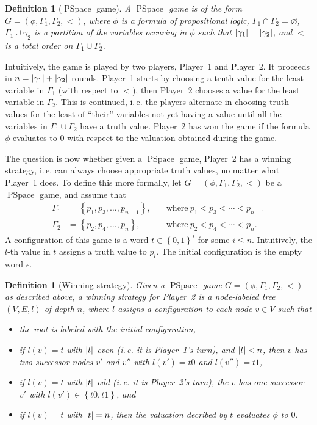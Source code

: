 \documentclass[openany]{scrbook}
\theoremstyle{break}
\newtheorem{Definition}[Theorem]{Definition}
\theoremstyle{nonumberbreak}
\theoremstyle{nonumberplain}
\theoremstyle{nonumberbreak}
\newcommand{\then}{\Longrightarrow}
\newcommand{\abs}[2][]{\left|{#2}\right|\ifx#1\then\else_{#1}\fi}
\newcommand{\set}[1]{\left\{#1\right\}}
\newcommand{\ie}{i{.}\,e{.}\xspace}
\newcommand{\PSpace}{\operatorname{PSpace}}
\begin{document}
\begin{Definition}[$\PSpace$ game]
  \label{6.3}
  A $\PSpace$ game is of the form $G = (\phi, \Gamma_1, \Gamma_2, <)$,
  where $\phi$ is a formula of propositional logic, $\Gamma_1 \cap
  \Gamma_2 = \varnothing$, $\Gamma_1 \cup \gamma_2$ is a partition of
  the variables occuring in $\phi$ such that $\abs{\gamma_1} =
  \abs{\gamma_2}$, and $<$ is a total order on $\Gamma_1 \cup
  \Gamma_2$.
\end{Definition}

Intuitively, the game is played by two players, Player~1 and
Player~2. It proceeds in $n = \abs{\gamma_1} + \abs{\gamma_2}$
rounds. Player~1 starts by choosing a truth value for the least
variable in $\Gamma_1$ (with respect to $<$), then Player~2 chooses a
value for the least variable in $\Gamma_2$. This is continued, \ie the
players alternate in choosing truth values for the least of ``their''
variables not yet having a value until all the variables in $\Gamma_1
\cup \Gamma_2$ have a truth value. Player~2 has won the game if the
formula $\phi$ evaluates to $0$ with respect to the valuation obtained
during the game.

The question is now whether given a $\PSpace$ game, Player~2 has a
winning strategy, \ie can always choose appropriate truth values, no
matter what Player~1 does. To define this more formally, let $G =
(\phi, \Gamma_1, \Gamma_2, <)$ be a $\PSpace$ game, and assume that
\begin{align*}
  \Gamma_1 & = \set{p_1, p_3, \dotsc, p_{n - 1}},\quad & \text{where}\
  p_1 < p_3 < \dotsb < p_{n - 1} \\
  \Gamma_2 & = \set{p_2, p_4, \dotsc, p_n},\quad & \text{where}\ p_2 <
  p_4 < \dotsb < p_n.
\end{align*}
A configuration of this game is a word $t \in \set{0, 1}^i$ for some
$i \leq n$. Intuitively, the $l$-th value in $t$ assigns a truth value
to $p_l$. The initial configuration is the empty word $\epsilon$.

\begin{Definition}[Winning strategy]
  \label{6.4}
  Given a $\PSpace$ game $G = (\phi, \Gamma_1, \Gamma_2, <)$ as
  described above, a winning strategy for Player~2 is a node-labeled
  tree $(V, E, l)$ of depth $n$, where $l$ assigns a configuration to
  each node $v \in V$ such that
  \begin{itemize}
  \item the root is labeled with the initial configuration,
  \item if $l(v) = t$ with $\abs{t}$ even (\ie it is Player~1's turn),
    and $\abs{t} < n$, then $v$ has two successor nodes $v'$ and $v''$
    with $l(v') = t0$ and $l(v'') = t1$,
  \item if $l(v) = t$ with $\abs{t}$ odd (\ie it is Player~2's turn),
    the $v$ has one successor $v'$ with $l(v') \in \set{t0, t1}$, and
  \item if $l(v) = t$ with $\abs{t} = n$, then the valuation decribed
    by $t$ evaluates $\phi$ to $0$.
  \end{itemize}
\end{Definition}
\end{document}
